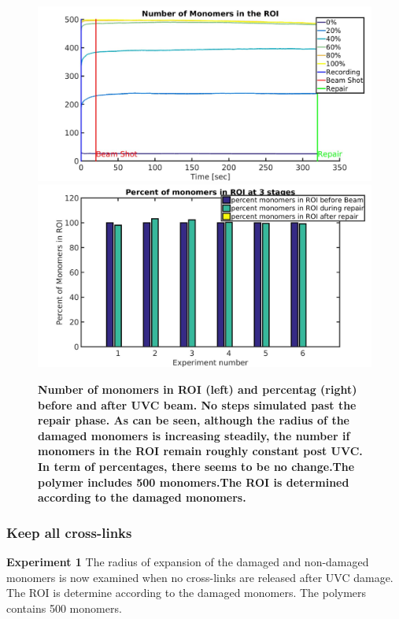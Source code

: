 \documentclass[12pt]{report}
\begin{document}
	\begin{figure}
	\includegraphics[width=0.5\linewidth, height=0.3\textheight]{Images/expandAffected/BreakAffectedCrosslinks/meanNumMonomersInROI}
	\includegraphics[width=0.5\linewidth, height=0.3\textheight]{Images/expandAffected/BreakAffectedCrosslinks/percentMonomersInROI}
	\caption{\tiny{\textbf{Number of monomers in ROI (left) and percentag (right) before and after UVC beam. No steps simulated past the repair phase. As can be seen, although the radius of the damaged monomers is increasing steadily, the number if monomers in the ROI remain roughly constant post UVC. In term of percentages, there seems to be no change.The polymer includes 500 monomers.The ROI is determined according to the damaged monomers.}}}
	\label{fig:meanNumMonomersInROI}
	\end{figure}
		
	
	\subsubsection{Keep all cross-links}
      \textbf{Experiment 1}
	   The radius of expansion of the damaged and non-damaged monomers is now examined when no cross-links are released after UVC damage. The ROI is determine according to the damaged monomers. The polymers contains 500 monomers. 
		     		     
\end{document}
